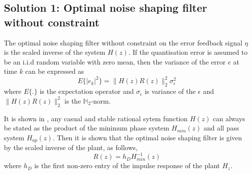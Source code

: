 \documentclass[a4paper]{article}
\begin{document}
\subsection{Solution 1: Optimal noise shaping filter without constraint}
The optimal noise shaping filter without constraint on the error feedback signal $\eta$ is the scaled inverse of the system $H(z)$.   If the quantisation error is assumed to be an i.i.d random variable with zero mean, then the variance of the error $e$ at time $k$  can be expressed as 
\begin{equation}
	E\{|e_{k}|^2\} = \|H(z) R(z) \|_{2}^{2} \sigma_{\epsilon}^{2}
\end{equation}
where $E\{.\}$ is the expectation operator and $\sigma_{\epsilon}$ is variance of the $\epsilon$ and $\|H(z) R(z) \|_{2}^{2}$  is the $\mathbb{H}_{2}$-norm.

It is shown in \cite{oppenheim99}, any casual and stable rational sytem function $H(z)$ can always be stated as the product of the minimum phase system $H_{min}(z)$ and all pass system $H_{ap}(z)$. Then it is shown that the optimal noise shaping filter is given by the scaled inverse of the plant, as follows, 
\begin{equation}
	R(z) = h_{D} H_{min}^{-1}(z)
\end{equation}
where $h_{D}$ is the first non-zero entry of the impulse response of the plant $H_{z}$.

 
\end{document}
